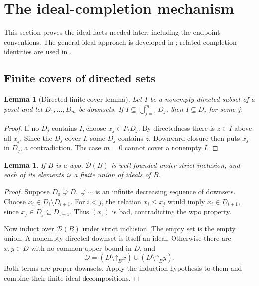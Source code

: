 \documentclass[11pt,letterpaper]{article}
\theoremstyle{teal}
\newtheorem{lemma}[theorem]{Lemma}
\theoremstyle{definition}
\newcommand{\Down}{\mathcal D}
\newcommand{\up}{\mathord\uparrow}
\begin{document}
\section{The ideal-completion mechanism}
This section proves the ideal facts needed later, including the endpoint conventions. The general ideal approach is developed in \cite{IdealApproach}; related completion identities are used in \cite[Section~5.2]{AHLLSSV}.

\subsection{Finite covers of directed sets}
\begin{lemma}[Directed finite-cover lemma]\label{lem:cover}
Let $I$ be a nonempty directed subset of a poset and let $D_1,\ldots,D_m$ be downsets. If $I\subseteq\bigcup_{j=1}^m D_j$, then $I\subseteq D_j$ for some $j$.
\end{lemma}
\begin{proof}
If no $D_j$ contains $I$, choose $x_j\in I\setminus D_j$. By directedness there is $z\in I$ above all $x_j$. Since the $D_j$ cover $I$, some $D_j$ contains $z$. Downward closure then puts $x_j$ in $D_j$, a contradiction. The case $m=0$ cannot cover a nonempty $I$.
\end{proof}

\begin{lemma}\label{lem:downwf}
If $B$ is a wpo, $\Down(B)$ is well-founded under strict inclusion, and each of its elements is a finite union of ideals of $B$.
\end{lemma}
\begin{proof}
Suppose $D_0\supsetneq D_1\supsetneq\cdots$ is an infinite decreasing sequence of downsets. Choose $x_i\in D_i\setminus D_{i+1}$. For $i<j$, the relation $x_i\leq x_j$ would imply $x_i\in D_{i+1}$, since $x_j\in D_j\subseteq D_{i+1}$. Thus $(x_i)$ is bad, contradicting the wpo property.

Now induct over $\Down(B)$ under strict inclusion. The empty set is the empty union. A nonempty directed downset is itself an ideal. Otherwise there are $x,y\in D$ with no common upper bound in $D$, and
\[
 D=(D\setminus\up_Bx)\cup(D\setminus\up_By).
\]
Both terms are proper downsets. Apply the induction hypothesis to them and combine their finite ideal decompositions.
\end{proof}
\end{document}

